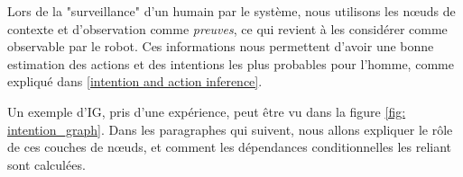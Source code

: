 \documentclass[a4paper,11pt,twoside]{StyleThese}
\begin{document}

Lors de la "surveillance" d'un humain par le système, nous utilisons les nœuds de contexte et d'observation comme \textit{preuves}, ce qui revient à les considérer comme observable par le robot. Ces informations nous permettent d'avoir une bonne estimation des actions et des intentions les plus probables pour l'homme, comme expliqué dans \ref{intention and action inference}.

Un exemple d'IG, pris d'une expérience, peut être vu dans la figure \ref{fig: intention_graph}. Dans les paragraphes qui suivent, nous allons expliquer le rôle de ces couches de nœuds, et comment les dépendances conditionnelles les reliant sont calculées.



\vspace{-10pt}
\end{document}

